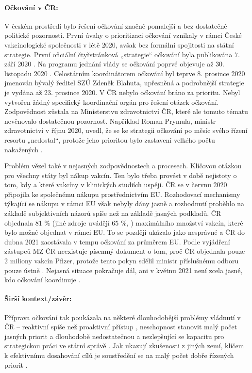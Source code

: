 \paragraph{Očkování v ČR:} V českém prostředí bylo řešení očkování značně pomalejší a bez dostatečné politické pozornosti. První úvahy o prioritizaci očkování vznikaly v rámci České vakcinologické společnosti v létě 2020, avšak bez formální spojitosti na státní strategie. První oficiální čtyřstránková „strategie“ očkování byla publikována 7. září 2020 \cite{mz2021strat}. Na programu jednání vlády se očkování poprvé objevuje až 30. listopadu 2020 \cite{vlada_prijala_2020}. Celostátním koordinátorem očkování byl teprve 8. prosince 2020 jmenován bývalý ředitel SZÚ Zdeněk Blahuta, upřesněná a podrobnější strategie je vydána až 23. prosince 2020. V ČR nebylo očkování bráno za prioritu. Nebyl vytvořen žádný specifický koordinační orgán pro řešení otázek očkování. Zodpovědnost zůstala na Ministerstvu zdravotnictví ČR, které ale tomuto tématu nevěnovalo dostatečnou pozornost. Například Roman Prymula, ministr zdravotnictví v říjnu 2020, uvedl, že se ke strategii očkování po měsíc svého řízení resortu „nedostal“, protože jeho prioritou bylo zastavení velkého počtu nakažených \cite{pokorna_startuje_2020}.

Problém vězel také v nejasných zodpovědnostech a procesech. Klíčovou otázkou pro všechny státy byl nákup vakcín. Ten bylo třeba provést v době nejistoty o tom, kdy a které vakcíny v klinických studiích uspějí. ČR se v červnu 2020 připojila ke společnému nákupu prostřednictvím EU. Rozhodovací mechanismy týkající se nákupu v rámci EU však nebyly dány jasně a rozhodnutí proběhlo na základě subjektivních názorů spíše než na základě jasných podkladů. ČR objednala 81 \% \cite{houska_cesko_2021} (jiné zdroje uvádějí 65 \%, \cite{koubsky_slozite_2021}) maximálního množství vakcín, které bylo možné objednat v rámci EU. To se později ukázalo jako nesprávné a ČR do dubna 2021 zaostávala v tempu očkování za průměrem EU. Podle vyjádření zástupců MZ ČR neexistuje písemný dokument o tom, proč ČR objednala pouze 2 miliony vakcín Pfizer, protože tento pokyn sdělil ministr příslušnému odboru pouze ústně \cite{pokorna_proc_2021} . Nejasná situace pokračuje dál, ani v květnu 2021 není zcela jasné, kdo očkování koordinuje \cite{televize_nevime_2021, skoupa_je_2021}.

\paragraph{Širší kontext/závěr:} Příprava očkování tak poukázala na některé dlouhodobější problémy vládnutí v ČR -- reaktivní spíše než proaktivní přístup \cite{hlidac_statu_nejvetsi_2020}, neschopnost stanovit malý počet jasných priorit \cite{sedlackova_stat_2020} a dlouhodobě nedostatečnou a nezlepšující se kapacitu pro strategickou práci ve státní správě \cite{ministerstvo_pro_mistni_rozvoj_cr_ministerstvo_2020} . Jak ukazují zkušenosti z jiných zemí, klíčem k efektivnímu dosahování cílů je soustředění se na malý počet dobře řízených priorit \cite{allas_delivering_2018, department_of_the_prime_minister_and_cabinet_our_2019, european_social_fund_public_2020}.

